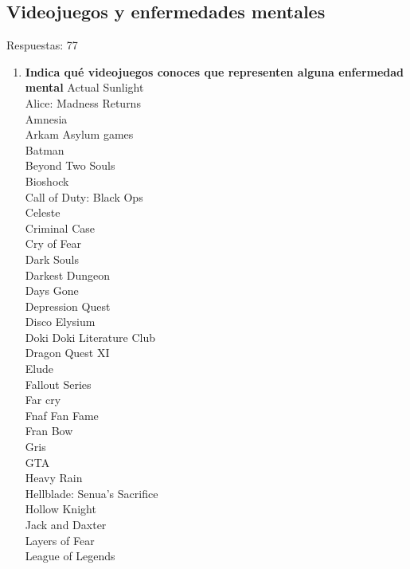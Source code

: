 \documentclass[12pt, a4paper,twoside,titlepage]{book}
\newcommand{\comm}[1]{\todo[linecolor=yellow]{\textsf{#1}}}
\begin{document}
\subsection{Videojuegos y enfermedades mentales}
\label{sec:listadoVid}


Respuestas: 77
\begin{enumerate}[label=\textbf{\arabic*}.]
     \item \textbf{Indica qué videojuegos conoces que representen alguna enfermedad mental}
    \label{listadoVid}
    Actual Sunlight             \\
    Alice: Madness Returns\\
    Amnesia\\
    Arkam Asylum games\\
    Batman\\
    Beyond Two Souls\\
    Bioshock \\
    Call of Duty: Black Ops\\
    Celeste\\
    Criminal Case\\
    Cry of Fear\\
    Dark Souls\\
    Darkest Dungeon\\
    Days Gone\\
    Depression Quest\\
    Disco Elysium\\
    Doki Doki Literature Club\\
    Dragon Quest XI\\
    Elude\\
    Fallout Series\\
    Far cry\\
    Fnaf Fan Fame\\
    Fran Bow\\
    Gris\\
    GTA\\
    Heavy Rain \\
    Hellblade: Senua's Sacrifice\\
    Hollow Knight\\
    Jack and Daxter\\
    Layers of Fear\\
    League of Legends\\

\end{enumerate}
\end{document}
